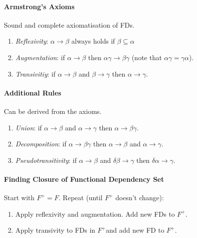 \documentclass[twocolumn,english]{article}
\begin{document}
\paragraph{Armstrong's Axioms}

Sound and complete axiomatisation of FDs.
\begin{enumerate}
\item \emph{Reflexivity}: $\alpha\rightarrow\beta$ always holds if $\beta\subseteq\alpha$
\item \emph{Augmentation}: if $\alpha\rightarrow\beta$ then $\alpha\gamma\rightarrow\beta\gamma$
(note that $\alpha\gamma=\gamma\alpha$).
\item \emph{Transivitiy}: if $\alpha\rightarrow\beta$ and $\beta\rightarrow\gamma$
then $\alpha\rightarrow\gamma$.
\end{enumerate}

\paragraph{Additional Rules}

Can be derived from the axioms.
\begin{enumerate}
\item \emph{Union}: if $\alpha\rightarrow\beta$ and $\alpha\rightarrow\gamma$
then $\alpha\rightarrow\beta\gamma$.
\item \emph{Decomposition}: if $\alpha\rightarrow\beta\gamma$ then $\alpha\rightarrow\beta$
and $\alpha\rightarrow\gamma$.
\item \emph{Pseudotransitivity}: if $\alpha\rightarrow\beta$ and $\delta\beta\rightarrow\gamma$
then $\delta\alpha\rightarrow\gamma$.
\end{enumerate}

\paragraph{Finding Closure of Functional Dependency Set}

Start with $F^{+}=F$. Repeat (until $F^{+}$ doesn't change):
\begin{enumerate}
\item Apply reflexivity and augmentation. Add new FDs to $F^{+}$.
\item Apply transivity to FDs in $F^{+}$and add new FD to $F^{+}$.
\end{enumerate}
\end{document}
